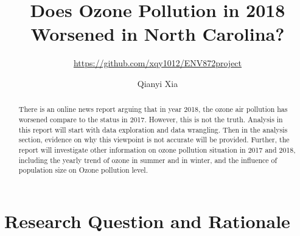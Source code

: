 \documentclass[12pt,]{article}
\title{Does Ozone Pollution in 2018 Worsened in North Carolina?}
\subtitle{\url{https://github.com/xqy1012/ENV872project}}
\author{Qianyi Xia}
\date{}
\begin{document}
\maketitle
\begin{abstract}
There is an online news report arguing that in year 2018, the ozone air
pollution has worsened compare to the status in 2017. However, this is
not the truth. Analysis in this report will start with data exploration
and data wrangling. Then in the analysis section, evidence on why this
viewpoint is not accurate will be provided. Further, the report will
investigate other information on ozone pollution situation in 2017 and
2018, including the yearly trend of ozone in summer and in winter, and
the influence of population size on Ozone pollution level.
\end{abstract}

\newpage

\tableofcontents  \newpage
\listoftables  \newpage
\listoffigures  \newpage

\section{Research Question and
Rationale}\label{research-question-and-rationale}
\end{document}
